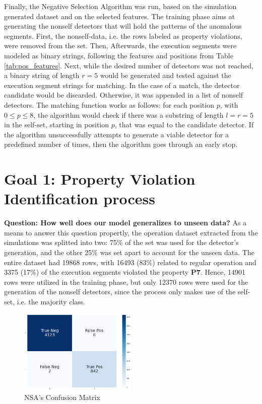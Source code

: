 Finally, the Negative Selection Algorithm was run, based on the simulation generated dataset and on the selected features. The training phase aims at generating the nonself detectors that will hold the patterns of the anomalous segments. First, the nonself-data, i.e. the rows labeled as property violations, were removed from the set. Then, Afterwards, the execution segments were modeled as binary strings, following the features and positions from Table \ref{tab:pos_features}. Next, while the desired number of detectors was not reached, a binary string of length \(r = 5\) would be generated and tested against the execution segment strings for matching. In the case of a match, the detector candidate would be discarded. Otherwise, it was appended in a list of nonself detectors. The matching function works as follows: for each position \(p\), with \(0 \leq p \leq 8\), the algorithm would check if there was a substring of length \(l=r=5\) in the self-set, starting in position \(p\), that was equal to the candidate detector. If the algorithm unsuccessfully attempts to generate a viable detector for a predefined number of times, then the algorithm goes through an early stop.

\section{Goal 1: Property Violation Identification process}

\textbf{Question: How well does our model generalizes to unseen data?} As a means to answer this question propertly, the operation dataset extracted from the simulations was splitted into two: 75\% of the set was used for the detector's generation, and the other 25\% was set apart to account for the unseen data. The entire dataset had 19868 rows, with 16493 (83\%) related to regular operation and 3375 (17\%) of the execution segments violated the property \textbf{P7}. Hence, 14901 rows were utilized in the training phase, but only 12370 rows were used for the generation of the nonself detectors, since the process only makes use of the self-set, i.e. the majority class.

\begin{figure}[!h]
	\centering
	\includegraphics[width=0.5\textwidth, keepaspectratio]{img/NSA_confusion_matrix.png}
	\caption{NSA's Confusion Matrix}
	\label{fig:nsa_conf}
\end{figure}

